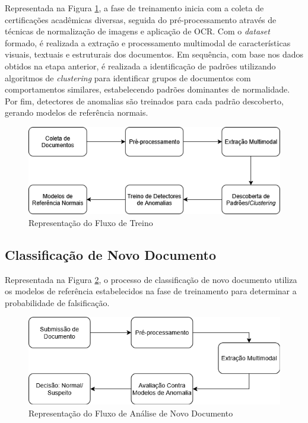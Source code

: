 Representada na Figura \ref{fig:fluxotreino}, a fase de treinamento inicia com a coleta de certificações acadêmicas diversas, seguida do pré-processamento através de técnicas de normalização de imagens e aplicação de OCR. Com o \textit{dataset} formado, é realizada a extração e processamento multimodal de características visuais, textuais e estruturais dos documentos. Em sequência, com base nos dados obtidos na etapa anterior, é realizada a identificação de padrões utilizando algoritmos de \textit{clustering} para identificar grupos de documentos com comportamentos similares, estabelecendo padrões dominantes de normalidade. Por fim, detectores de anomalias são treinados para cada padrão descoberto, gerando modelos de referência normais.

\begin{figure}[H]
	\caption{\label{fig:fluxotreino}Representação do Fluxo de Treino}
    \begin{center}
    \includegraphics[width=.9\linewidth]{images/FluxoTreino.png}
	\end{center}
\end{figure}

\subsection{Classificação de Novo Documento}

Representada na Figura \ref{fig:fluxoanalise}, o processo de classificação de novo documento utiliza os modelos de referência estabelecidos na fase de treinamento para determinar a probabilidade de falsificação.

\begin{figure}[H]
	\caption{\label{fig:fluxoanalise}Representação do Fluxo de Análise de Novo Documento}
    \begin{center}
    \includegraphics[width=.9\linewidth]{images/FluxoAnalise.png}
	\end{center}
\end{figure}

